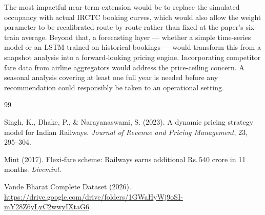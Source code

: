 \documentclass[10pt,a4paper]{article}
\begin{document}
The most impactful near-term extension would be to replace the simulated occupancy with actual IRCTC booking curves, which would also allow the weight parameter to be recalibrated route by route rather than fixed at the paper's six-train average. Beyond that, a forecasting layer --- whether a simple time-series model or an LSTM trained on historical bookings --- would transform this from a snapshot analysis into a forward-looking pricing engine. Incorporating competitor fare data from airline aggregators would address the price-ceiling concern. A seasonal analysis covering at least one full year is needed before any recommendation could responsibly be taken to an operational setting.

\begin{thebibliography}{99}
 
Singh, K., Dhake, P., \& Narayanaswami, S. (2023).
A dynamic pricing strategy model for Indian Railways.
\textit{Journal of Revenue and Pricing Management}, 23, 295--304.
 
Mint (2017). Flexi-fare scheme: Railways earns additional Rs.\,540 crore in 11 months.
\textit{Livemint}.
 
Vande Bharat Complete Dataset (2026).
\url{https://drive.google.com/drive/folders/1GWaHyWj9oSI-mY28Z6yLyC2wwyIXtaG6}
 
\end{thebibliography}
 
\end{document}
